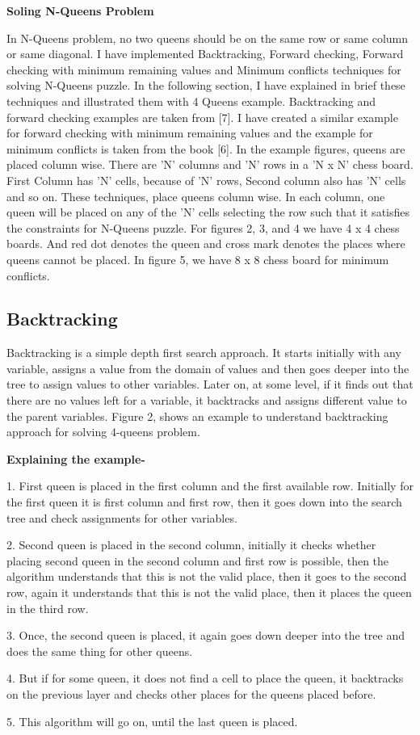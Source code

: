 \documentclass[conference]{IEEEtran}
\begin{document}
 
\textbf{Soling N-Queens Problem}
\par In N-Queens problem, no two queens should be on the same row or same column or same diagonal. I have implemented Backtracking, Forward checking, Forward checking with minimum remaining values and Minimum conflicts techniques for solving N-Queens puzzle. In the following section, I have explained in brief these techniques and illustrated them with 4 Queens example. Backtracking and forward checking examples are taken from [7]. I have created a similar example for forward checking with minimum remaining values and the example for minimum conflicts is taken from the book [6]. In the example figures, queens are placed column wise. There are 'N' columns and 'N' rows in a 'N x N' chess board. First Column has 'N' cells, because of 'N' rows, Second column also has 'N' cells and so on. These techniques, place queens column wise. In each column, one queen will be placed on any of the 'N' cells selecting the row such that it satisfies the constraints for N-Queens puzzle. For figures 2, 3, and 4 we have 4 x 4 chess boards. And red dot denotes the queen and cross mark denotes the places where queens cannot be placed. In figure 5, we have 8 x 8 chess board for minimum conflicts.

\subsection{Backtracking}
 Backtracking is a simple depth first search approach. It starts initially with any variable, assigns a value from the domain of values and then goes deeper into the tree to assign values to other variables. Later on, at some level, if it finds out that there are no values left for a variable, it backtracks and assigns different value to the parent variables. Figure 2, shows an example to understand backtracking approach for solving 4-queens problem.
 
 \textbf{Explaining the example- }

1. First queen is placed in the first column and the first available row. Initially for the first queen it is first column and first row, then it goes down into the search tree and check assignments for other variables.
\par 2. Second queen is placed in the second column, initially it checks whether placing second queen in the second column and first row is possible, then the algorithm understands that this is not the valid place, then it goes to the second row, again it understands that this is not the valid place, then it places the queen in the third row.
\par 3. Once, the second queen is placed, it again goes down deeper into the tree and does the same thing for other queens.
\par 4. But if for some queen, it does not find a cell to place the queen, it backtracks on the previous layer and checks other places for the queens placed before.
\par 5. This algorithm will go on, until the last queen is placed.
\end{document}
